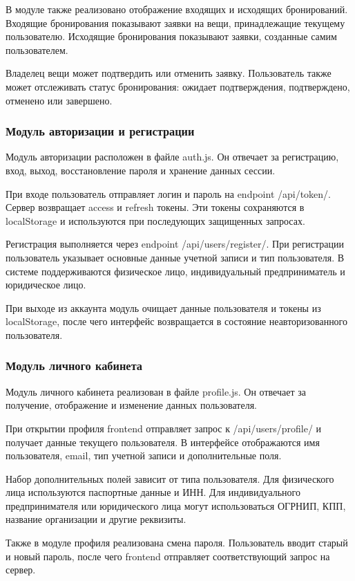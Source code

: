 В модуле также реализовано отображение входящих и исходящих бронирований. Входящие бронирования показывают заявки на вещи, принадлежащие текущему пользователю. Исходящие бронирования показывают заявки, созданные самим пользователем.

Владелец вещи может подтвердить или отменить заявку. Пользователь также может отслеживать статус бронирования: ожидает подтверждения, подтверждено, отменено или завершено.

\subsubsection{Модуль авторизации и регистрации}

Модуль авторизации расположен в файле auth.js. Он отвечает за регистрацию, вход, выход, восстановление пароля и хранение данных сессии.

При входе пользователь отправляет логин и пароль на endpoint /api/token/. Сервер возвращает access и refresh токены. Эти токены сохраняются в localStorage и используются при последующих защищенных запросах.

Регистрация выполняется через endpoint /api/users/register/. При регистрации пользователь указывает основные данные учетной записи и тип пользователя. В системе поддерживаются физическое лицо, индивидуальный предприниматель и юридическое лицо.

При выходе из аккаунта модуль очищает данные пользователя и токены из localStorage, после чего интерфейс возвращается в состояние неавторизованного пользователя.

\subsubsection{Модуль личного кабинета}

Модуль личного кабинета реализован в файле profile.js. Он отвечает за получение, отображение и изменение данных пользователя.

При открытии профиля frontend отправляет запрос к /api/users/profile/ и получает данные текущего пользователя. В интерфейсе отображаются имя пользователя, email, тип учетной записи и дополнительные поля.

Набор дополнительных полей зависит от типа пользователя. Для физического лица используются паспортные данные и ИНН. Для индивидуального предпринимателя или юридического лица могут использоваться ОГРНИП, КПП, название организации и другие реквизиты.

Также в модуле профиля реализована смена пароля. Пользователь вводит старый и новый пароль, после чего frontend отправляет соответствующий запрос на сервер.

